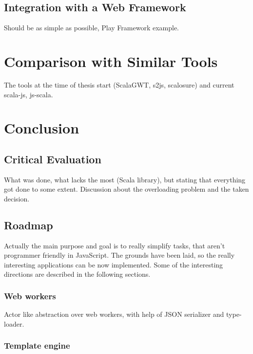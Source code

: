 \documentclass[12pt,a4paper]{report}
\begin{document}
\section{Integration with a Web Framework}

Should be as simple as possible, Play Framework example.



\chapter{Comparison with Similar Tools}

The tools at the time of thesis start (ScalaGWT, s2js, scalosure) and current scala-js, js-scala.



\chapter{Conclusion}

\section{Critical Evaluation}

What was done, what lacks the most (Scala library), but stating that everything got done to some extent. Discussion about the overloading problem and the taken decision.

\section{Roadmap}

Actually the main purpose and goal is to really simplify tasks, that aren't programmer friendly in JavaScript. The grounds have been laid, so the really interesting applications can be now implemented. Some of the interesting directions are described in the following sections.

\subsection{Web workers}

Actor like abstraction over web workers, with help of JSON serializer and type-loader.

\subsection{Template engine}
\end{document}
